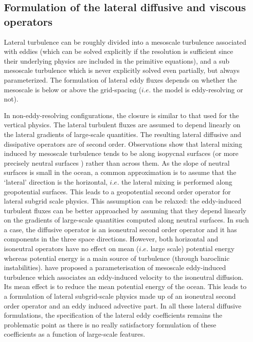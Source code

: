 \documentclass[../main/NEMO_manual]{subfiles}
\begin{document}
\subsection{Formulation of the lateral diffusive and viscous operators}
\label{subsec:PE_ldf}

Lateral turbulence can be roughly divided into a mesoscale turbulence associated with eddies
(which can be solved explicitly if the resolution is sufficient since
their underlying physics are included in the primitive equations),
and a sub mesoscale turbulence which is never explicitly solved even partially, but always parameterized.
The formulation of lateral eddy fluxes depends on whether the mesoscale is below or above the grid-spacing
($i.e.$ the model is eddy-resolving or not).

In non-eddy-resolving configurations, the closure is similar to that used for the vertical physics.
The lateral turbulent fluxes are assumed to depend linearly on the lateral gradients of large-scale quantities.
The resulting lateral diffusive and dissipative operators are of second order.
Observations show that lateral mixing induced by mesoscale turbulence tends to be along isopycnal surfaces
(or more precisely neutral surfaces \cite{McDougall1987}) rather than across them.
As the slope of neutral surfaces is small in the ocean, a common approximation is to assume that
the `lateral' direction is the horizontal, $i.e.$ the lateral mixing is performed along geopotential surfaces.
This leads to a geopotential second order operator for lateral subgrid scale physics.
This assumption can be relaxed: the eddy-induced turbulent fluxes can be better approached by assuming that
they depend linearly on the gradients of large-scale quantities computed along neutral surfaces.
In such a case, the diffusive operator is an isoneutral second order operator and
it has components in the three space directions.
However,
both horizontal and isoneutral operators have no effect on mean ($i.e.$ large scale) potential energy whereas
potential energy is a main source of turbulence (through baroclinic instabilities).
\citet{Gent1990} have proposed a parameterisation of mesoscale eddy-induced turbulence which
associates an eddy-induced velocity to the isoneutral diffusion.
Its mean effect is to reduce the mean potential energy of the ocean.
This leads to a formulation of lateral subgrid-scale physics made up of an isoneutral second order operator and
an eddy induced advective part.
In all these lateral diffusive formulations,
the specification of the lateral eddy coefficients remains the problematic point as
there is no really satisfactory formulation of these coefficients as a function of large-scale features.
\end{document}

